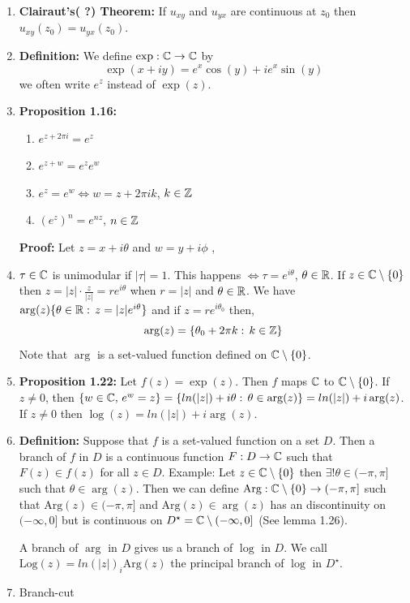 \documentclass[12pt]{article}
\begin{document}
\begin{enumerate}
    \item \textbf{Clairaut's( ?) Theorem:} If $u_{xy}$ and $u_{yx}$ are continuous at $z_0$ then $u_{xy}(z_0) = u_{yx}(z_0)$.
    
    \item \textbf{Definition:} We define $\exp: \mathbb C \to \mathbb C$ by 
    \[\exp (x+iy) = e^x\cos(y) + ie^x\sin(y)\]
    we often write $e^z$ instead of $\exp(z)$. 
    
    \item \textbf{Proposition 1.16:} 
    \begin{enumerate}
        \item [(a)] $e^{z+2\pi i} = e^z$
        \item [(b)] $e^{z+w} = e^ze^w$
        \item [(c)] $e^z = e^w \iff w = z+2\pi ik$, $k \in \mathbb Z$
        \item [(d)] $(e^z)^n = e^{nz}$, $n \in \mathbb Z$
    \end{enumerate}

    \textbf{Proof:} Let $z =x + i\theta$ and $w = y + i \phi$ \todo{}, 
    \item $\tau \in \mathbb C$ is unimodular if $|\tau| = 1$. This happens $\iff \tau =e^{i\theta}$, $\theta \in \mathbb R$. If $z \in \mathbb C \setminus \{0\}$ then $ z = |z| \cdot \frac{z}{|z|} = re^{i\theta}$ when $r = |z|$ and $\theta \in \mathbb R$. We have $\arg(z) \{ \theta \in \mathbb R: \, z = |z|e^{i\theta}\}$ and if $z = re^{i\theta_0}$ then, $$\arg(z) = \{\theta_0 + 2 \pi k: \, k \in \mathbb Z\}$$ Note that $\arg$ is a set-valued function defined on $\mathbb C \setminus \{0\}$. 
    
    \item \textbf{Proposition 1.22:} Let $f(z) = \exp(z)$. Then $f$ maps $\mathbb C$ to $\mathbb C \setminus \{0\}$. If $z \neq 0$, then $\{w \in \mathbb C, \, e^w = z\} =\{ln(|z|) + i\theta: \, \theta \in \arg(z)\} = ln(|z|) + i\arg(z)$. If $z \neq 0$ then $\log (z) = ln(|z|) + i \arg(z)$. 
    
    \item \textbf{Definition:} Suppose that $f$ is a set-valued function on a set $D$. Then a branch of $f$ in $D$ is a continuous function $F: D \to \mathbb C$ such that $F(z) \in f(z) $ for all $z \in D$. Example: 
    Let $z \in \mathbb C \setminus \{0\}$ then $\exists! \theta \in (-\pi, \pi]$ such that $\theta \in \arg(z)$. Then we can define $\text{Arg}: \mathbb C \setminus \{0\} \to (-\pi, \pi]$ such that $\text{Arg}(z) \in (-\pi, \pi]$ and $\text{Arg}(z) \in \arg(z)$ has an discontinuity on $(-\infty, 0]$ but is continuous on $D ^\star  = \mathbb C \setminus (-\infty, 0]$ (See lemma 1.26). 

    A branch of $\arg$ in $D$ gives us a branch of $\log$ in $D$. We call $\text{Log}(z) = ln (|z|) _ i \text{Arg}(z)$ the principal branch of $\log$ in $D^\star$.  

    \item Branch-cut
\end{enumerate}
\end{document}
